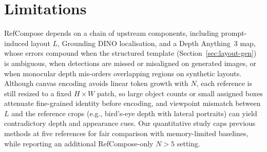 \section{Limitations}

RefCompose depends on a chain of upstream components, including prompt-induced layout $L$, Grounding DINO localisation, and a Depth Anything~3 map, whose errors compound when the structured template (Section~\ref{sec:layout-gen}) is ambiguous, when detections are missed or misaligned on generated images, or when monocular depth mis-orders overlapping regions on synthetic layouts.
Although canvas encoding avoids linear token growth with $N$, each reference is still resized to a fixed $H \times W$ patch, so large object counts or small assigned boxes attenuate fine-grained identity before encoding, and viewpoint mismatch between $L$ and the reference crops (e.g., bird's-eye depth with lateral portraits) can yield contradictory depth and appearance cues.
Our quantitative study caps previous methods at five references for fair comparison with memory-limited baselines, while reporting an additional RefCompose-only $N{>}5$ setting.

